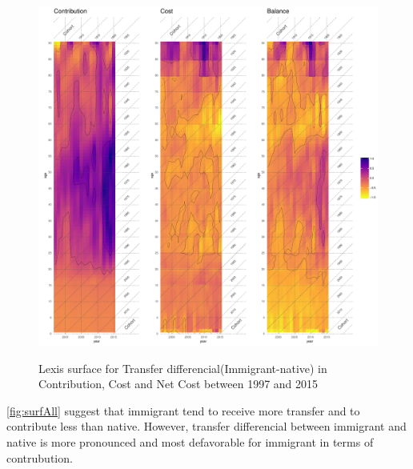 \begin{figure}[H]%
  \caption{Lexis surface for Transfer differencial(Immigrant-native) in Contribution, Cost and Net Cost between 1997 and 2015}
  \includegraphics[width=1\textwidth]{./res/surfAll.pdf}%
  \label{fig:surfAll}%
\end{figure}%



  \autoref{fig:surfAll} suggest that immigrant tend to receive more transfer and to contribute less than native. However, transfer differencial between immigrant and native is more pronounced and most defavorable for immigrant in terms of contrubution.